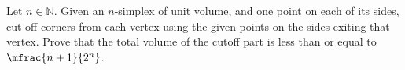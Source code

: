 Let $n \in \mathbb{N}$.
Given an $n$-simplex of unit volume,
and one point on each of its sides,
cut off corners from each vertex
using the given points on the sides exiting that vertex.
Prove that the total volume of the cutoff part
is less than or equal to $\mfrac{n+1}{2^n}$.
